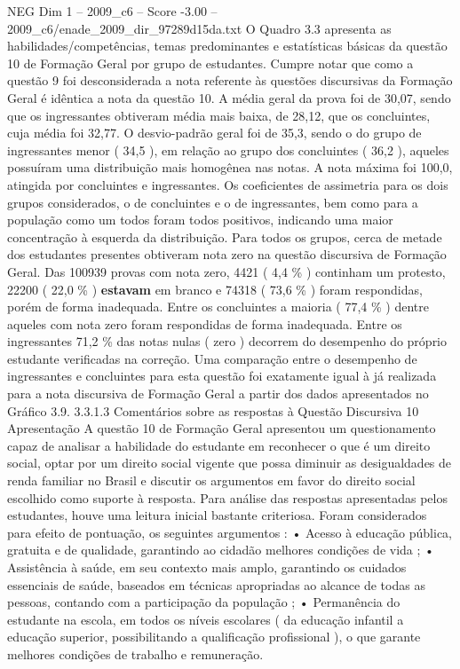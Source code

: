 \begin{textsample}{NEG Dim 1 – 2009\_c6 – Score -3.00 – 2009\_c6/enade\_2009\_dir\_97289d15da.txt}
O Quadro 3.3 apresenta as habilidades/competências, temas predominantes e estatísticas básicas da questão 10 de Formação Geral por grupo de estudantes.
Cumpre notar que como a questão 9 foi desconsiderada a nota referente às questões discursivas da Formação Geral é idêntica a nota da questão 10.
A média geral da prova foi de 30,07, sendo que os ingressantes obtiveram média mais baixa, de 28,12, que os concluintes, cuja média foi 32,77.
O desvio-padrão geral foi de 35,3, sendo o do grupo de ingressantes menor ( 34,5 ), em relação ao grupo dos concluintes ( 36,2 ), aqueles possuíram uma distribuição mais homogênea nas notas.
A nota máxima foi 100,0, atingida por concluintes e ingressantes.
Os coeficientes de assimetria para os dois grupos considerados, o de concluintes e o de ingressantes, bem como para a população como um todos foram todos positivos, indicando uma maior concentração à esquerda da distribuição.
Para todos os grupos, cerca de metade dos estudantes presentes obtiveram nota zero na questão discursiva de Formação Geral.
Das 100939 provas com nota zero, 4421 ( 4,4 \% ) continham um protesto, 22200 ( 22,0 \% ) \textbf{estavam} em branco e 74318 ( 73,6 \% ) foram respondidas, porém de forma inadequada.
Entre os concluintes a maioria ( 77,4 \% ) dentre aqueles com nota zero foram respondidas de forma inadequada.
Entre os ingressantes 71,2 \% das notas nulas ( zero ) decorrem do desempenho do próprio estudante verificadas na correção.
Uma comparação entre o desempenho de ingressantes e concluintes para esta questão foi exatamente igual à já realizada para a nota discursiva de Formação Geral a partir dos dados apresentados no Gráfico 3.9. 3.3.1.3 Comentários sobre as respostas à Questão Discursiva 10 Apresentação A questão 10 de Formação Geral apresentou um questionamento capaz de analisar a habilidade do estudante em reconhecer o que é um direito social, optar por um direito social vigente que possa diminuir as desigualdades de renda familiar no Brasil e discutir os argumentos em favor do direito social escolhido como suporte à resposta.
Para análise das respostas apresentadas pelos estudantes, houve uma leitura inicial bastante criteriosa.
Foram considerados para efeito de pontuação, os seguintes argumentos : • Acesso à educação pública, gratuita e de qualidade, garantindo ao cidadão melhores condições de vida ; • Assistência à saúde, em seu contexto mais amplo, garantindo os cuidados essenciais de saúde, baseados em técnicas apropriadas ao alcance de todas as pessoas, contando com a participação da população ; • Permanência do estudante na escola, em todos os níveis escolares ( da educação infantil a educação superior, possibilitando a qualificação profissional ), o que garante melhores condições de trabalho e remuneração.

\end{textsample}
